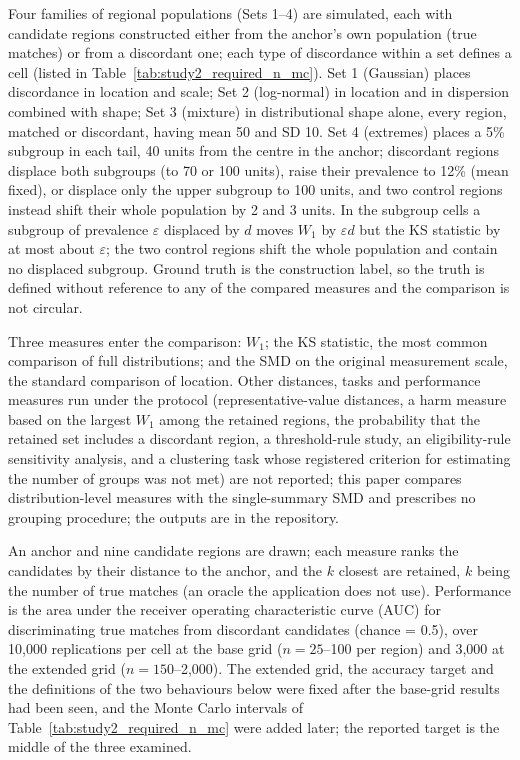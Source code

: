 \documentclass[AMA,Times1COL]{WileyNJDv5}
\begin{document}
Four families of regional populations (Sets 1--4) are simulated, each with candidate regions constructed either from the anchor's own population (true matches) or from a discordant one; each type of discordance within a set defines a cell (listed in Table~\ref{tab:study2_required_n_mc}). Set 1 (Gaussian) places discordance in location and scale; Set 2 (log-normal) in location and in dispersion combined with shape; Set 3 (mixture) in distributional shape alone, every region, matched or discordant, having mean 50 and SD 10. Set 4 (extremes) places a 5\% subgroup in each tail, 40 units from the centre in the anchor; discordant regions displace both subgroups (to 70 or 100 units), raise their prevalence to 12\% (mean fixed), or displace only the upper subgroup to 100 units, and two control regions instead shift their whole population by 2 and 3 units. In the subgroup cells a subgroup of prevalence $\varepsilon$ displaced by $d$ moves $W_1$ by $\varepsilon d$ but the KS statistic by at most about $\varepsilon$; the two control regions shift the whole population and contain no displaced subgroup. Ground truth is the construction label, so the truth is defined without reference to any of the compared measures and the comparison is not circular.

Three measures enter the comparison: $W_1$; the KS statistic, the most common comparison of full distributions; and the SMD on the original measurement scale, the standard comparison of location. %
Other distances, tasks and performance measures run under the protocol (representative-value distances, a harm measure based on the largest $W_1$ among the retained regions, the probability that the retained set includes a discordant region, a threshold-rule study, an eligibility-rule sensitivity analysis, and a clustering task whose registered criterion for estimating the number of groups was not met) are not reported; this paper compares distribution-level measures with the single-summary SMD and prescribes no grouping procedure; the outputs are in the repository.

An anchor and nine candidate regions are drawn; each measure ranks the candidates by their distance to the anchor, and the $k$ closest are retained, $k$ being the number of true matches (an oracle the application does not use). Performance is the area under the receiver operating characteristic curve (AUC) for discriminating true matches from discordant candidates (chance = 0.5), over 10{,}000 replications per cell at the base grid ($n = 25$--100 per region) and 3{,}000 at the extended grid ($n = 150$--2{,}000). The extended grid, the accuracy target and the definitions of the two behaviours below were fixed after the base-grid results had been seen, and the Monte Carlo intervals of Table~\ref{tab:study2_required_n_mc} were added later; the reported target is the middle of the three examined.
\end{document}
